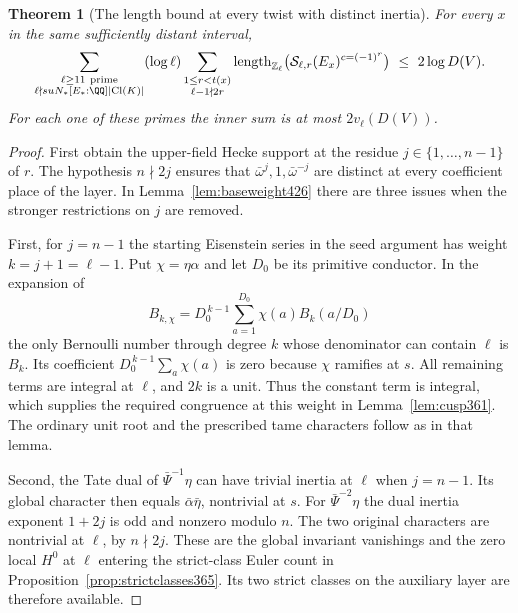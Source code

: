 \documentclass[a4paper,11pt]{article}
\newtheorem{theorem}[proposition]{Theorem}
\theoremstyle{definition}
\theoremstyle{remark}
\newcommand{\ZZ}{\mathbb Z}\newcommand{\ord}{\operatorname{ord}}
\numberwithin{equation}{section}
\begin{document}
\begin{theorem}[The length bound at every twist with distinct inertia]\leavevmode
\label{thm:adjacentweights427}
For every \(x\) in the same sufficiently distant interval,
\[
 \sum_{\substack{\ell\ge11\ {\rm prime}\\
           \ell\nmid suN_*[E_*:\QQ]|\mathrm{Cl}(K)|}}
   (\log\ell)
   \sum_{\substack{1\le r<t(x)\\ \ell-1\nmid 2r}}
         \operatorname{length}_{\ZZ_\ell}
           \bigl(\mathcal S_{\ell,r}(E_x)^{c=(-1)^r}\bigr)
       \ \le\ 2\log D(V).
\]
For each one of these primes the inner sum is at most
\(2v_\ell(D(V))\).
\end{theorem}
\begin{proof}
First obtain the upper-field Hecke support at the residue
\(j\in\{1,\dots,n-1\}\) of \(r\). The hypothesis
\(n\nmid 2j\) ensures that \(\bar\omega^j,1,\bar\omega^{-j}\)
are distinct at every coefficient place of the layer. In
Lemma~\ref{lem:baseweight426} there are three issues when the
stronger restrictions on \(j\) are removed.

First, for \(j=n-1\) the starting Eisenstein series in the seed
argument has weight \(k=j+1=\ell-1\). Put \(\chi=\eta\alpha\)
and let \(D_0\) be its primitive conductor. In the expansion of
\[
 B_{k,\chi}=D_0^{\,k-1}\sum_{a=1}^{D_0}
                            \chi(a)B_k(a/D_0)
\]
the only Bernoulli number through degree \(k\) whose denominator
can contain \(\ell\) is \(B_k\). Its coefficient
\(D_0^{\,k-1}\sum_a\chi(a)\) is zero because \(\chi\)
ramifies at \(s\). All remaining terms are integral at \(\ell\),
and \(2k\) is a unit. Thus the constant term is integral,
which supplies the required congruence at this weight in
Lemma~\ref{lem:cusp361}. The ordinary unit root and the
prescribed tame characters follow as in that lemma.

Second, the Tate dual of \(\bar\Psi^{-1}\eta\) can have trivial
inertia at \(\ell\) when \(j=n-1\). Its global character then
equals \(\bar\alpha\bar\eta\), nontrivial at \(s\). For
\(\bar\Psi^{-2}\eta\) the dual inertia exponent \(1+2j\)
is odd and nonzero modulo \(n\). The two original characters
are nontrivial at \(\ell\), by \(n\nmid2j\). These are the
global invariant vanishings and the zero local \(H^0\) at
\(\ell\) entering the strict-class Euler count in
Proposition~\ref{prop:strictclasses365}. Its two strict classes
on the auxiliary layer are therefore available.


\end{proof}
\end{document}
